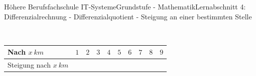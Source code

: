\documentclass[oneside,openany,headings=optiontotoc,11pt,numbers=noenddot]{scrreprt}
\begin{document}
\begin{worksheet}{Höhere Berufsfachschule IT-Systeme}{Grundstufe - Mathematik}{Lernabschnitt 4: Differenzialrechnung - Differenzialquotient - Steigung an einer bestimmten Stelle}
\begin{framed}
		\end{framed}
		\begin{framed}
			\noindent
			\footnotesize{\color{codegray}{Steigung über den Streckenverlauf}}\\
			\normalsize
			\renewcommand{\arraystretch}{1.5}
			\begin{tabularx}{\textwidth}{L{2cm}|M|M|M|M|M|M|M|M|M|}
				Nach \(x\ km\) & \(1\) & \(2\) & \(3\) & \(4\) & \(5\) & \(6\) & \(7\) & \(8\) & \(9\)\\
				\hline
				Steigung nach \(x\ km\) & & & & & & & & &\\
			\end{tabularx}
		\end{framed}
	\end{worksheet}
\end{document}
